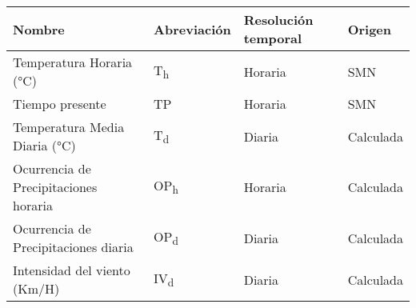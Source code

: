 \begin{table}[ht]
\centering
\begin{tabular}{llll}
  \hline
Nombre & Abreviación & Resolución temporal & Origen \\ 
  \hline
Temperatura Horaria (°C) & T\textsubscript{h} & Horaria & SMN \\ 
  Tiempo presente & TP & Horaria & SMN \\ 
  Temperatura Media Diaria (°C) & T\textsubscript{d} & Diaria & Calculada \\ 
  Ocurrencia de Precipitaciones horaria & OP\textsubscript{h} & Horaria & Calculada \\ 
  Ocurrencia de Precipitaciones diaria & OP\textsubscript{d} & Diaria & Calculada \\ 
  Intensidad del viento (Km/H) & IV\textsubscript{d} & Diaria & Calculada \\ 
   \hline
\end{tabular}
\end{table}
